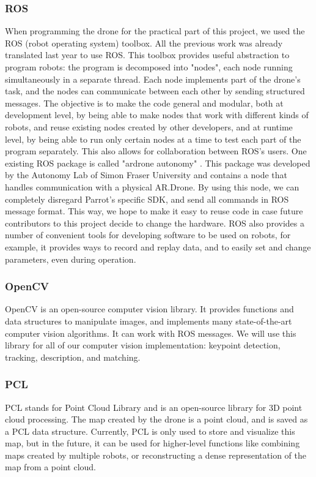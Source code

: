 \subsubsection{ROS}\label{sssec:ROS}
When programming the drone for the practical part of this project, we used the ROS (robot operating system) toolbox. All the previous work was already translated last year to use ROS. This toolbox provides useful abstraction to program robots: the program is decomposed into "nodes", each node running simultaneously in a separate thread. Each node implements part of the drone's task, and the nodes can communicate between each other by sending structured messages. The objective is to make the code general and modular, both at development level, by being able to make nodes that work with different kinds of robots, and reuse existing nodes created by other developers, and at runtime level, by being able to run only certain nodes at a time to test each part of the program separately. This also allows for collaboration between ROS's users. One existing ROS package is called "ardrone autonomy" \cite{ardroneautonomy}. This package was developed by the Autonomy Lab of Simon Fraser University and contains a node that handles communication with a physical AR.Drone. By using this node, we can completely disregard Parrot's specific SDK, and send all commands in ROS message format. This way, we hope to make it easy to reuse code in case future contributors to this project decide to change the hardware. ROS also provides a number of convenient tools for developing software to be used on robots, for example, it provides ways to record and replay data, and to easily set and change parameters, even during operation.

\subsubsection{OpenCV}
OpenCV is an open-source computer vision library. It provides functions and data structures to manipulate images, and implements many state-of-the-art computer vision algorithms. It can work with ROS messages. We will use this library for all of our computer vision implementation: keypoint detection, tracking, description, and matching.

\subsubsection{PCL}
PCL stands for Point Cloud Library and is an open-source library for 3D point cloud processing. The map created by the drone is a point cloud, and is saved as a PCL data structure. Currently, PCL is only used to store and visualize this map, but in the future, it can be used for higher-level functions like combining maps created by multiple robots, or reconstructing a dense representation of the map from a point cloud.

